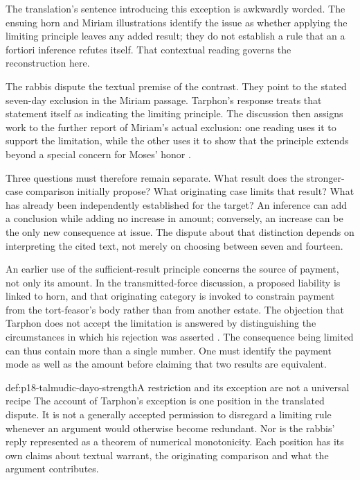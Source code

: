 The translation's sentence introducing this exception is awkwardly
worded. The ensuing horn and Miriam illustrations identify the issue
as whether applying the limiting principle leaves any added result;
they do not establish a rule that an a fortiori inference refutes
itself. That contextual reading governs the reconstruction here.

The rabbis dispute the textual premise of the contrast. They point
to the stated seven-day exclusion in the Miriam passage.
Tarphon's response treats that statement itself as indicating the
limiting principle. The discussion then assigns work to the further
report of Miriam's actual exclusion: one reading uses it to support
the limitation, while the other uses it to show that the principle
extends beyond a special concern for Moses' honor
\parencite[pp.~51--52]{RodkinsonBabaKamaCopyright1900}.

Three questions must therefore remain separate. What result does
the stronger-case comparison initially propose? What originating
case limits that result? What has already been independently
established for the target? An inference can add a conclusion while
adding no increase in amount; conversely, an increase can be the
only new consequence at issue. The dispute about that distinction
depends on interpreting the cited text, not merely on choosing
between seven and fourteen.

An earlier use of the sufficient-result principle concerns the
source of payment, not only its amount. In the transmitted-force
discussion, a proposed liability is linked to horn, and that
originating category is invoked to constrain payment from the
tort-feasor's body rather than from another estate. The objection
that Tarphon does not accept the limitation is answered by
distinguishing the circumstances in which his rejection was
asserted \parencite[p.~35]{RodkinsonBabaKamaCopyright1900}.
The consequence being limited can thus contain more than a
single number. One must identify the payment mode as well as
the amount before claiming that two results are equivalent.

\begin{hbwarning}{def:p18-talmudic-dayo-strength}{A restriction and its exception are not a universal recipe}
The account of Tarphon's exception is one position in the translated
dispute. It is not a generally accepted permission to disregard a
limiting rule whenever an argument would otherwise become redundant.
Nor is the rabbis' reply represented as a theorem of numerical
monotonicity. Each position has its own claims about textual warrant,
the originating comparison and what the argument contributes.
\end{hbwarning}

